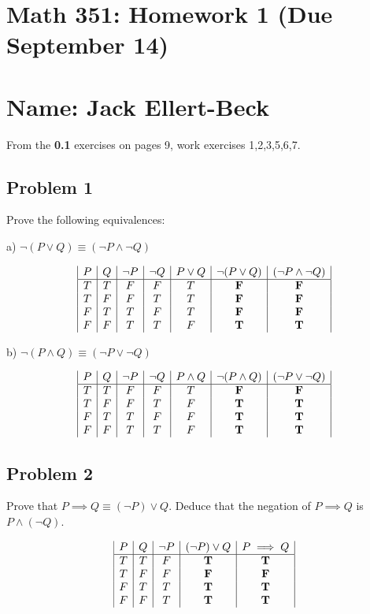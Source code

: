 \documentclass[11pt]{article}
\begin{document}
\setlength{\parindent}{0pt}
\setlength{\parskip}{9pt}


\section*{Math 351: Homework 1 (Due September 14)}
\section*{Name: Jack Ellert-Beck}

\bigskip

From the {\bf 0.1} exercises on pages 9, work exercises 1,2,3,5,6,7.

\subsection*{Problem 1}

Prove the following equivalences:

a) $\lnot (P \lor Q) \equiv (\neg P \land \lnot Q)$

$$
\begin{array}{|c|c|c|c|c|c|c|}
P & Q & \lnot P & \lnot Q & P \lor Q & \lnot (P \lor Q) & (\lnot P \land \lnot Q) \\
\hline
T & T & F & F & T & \bf F & \bf F \\
T & F & F & T & T & \bf F & \bf F \\
F & T & T & F & T & \bf F & \bf F \\
F & F & T & T & F & \bf T & \bf T \\
\end{array}
$$

b) $\lnot (P \land Q) \equiv (\lnot P \lor \lnot Q)$

$$
\begin{array}{|c|c|c|c|c|c|c|}
P & Q & \lnot P & \lnot Q & P \land Q & \lnot (P \land Q) & (\lnot P \lor \lnot Q) \\
\hline
T & T & F & F & T & \bf F & \bf F \\
T & F & F & T & F & \bf T & \bf T \\
F & T & T & F & F & \bf T & \bf T \\
F & F & T & T & F & \bf T & \bf T \\
\end{array}
$$

\subsection*{Problem 2}

Prove that $P \implies Q \equiv (\lnot P) \lor Q$. Deduce that the negation of
$P \implies Q$ is $P \land (\lnot Q)$.

$$
\begin{array}{|c|c|c|c|c|}
P & Q & \lnot P & (\lnot P) \lor Q & P \implies Q \\
\hline
T & T & F & \bf T & \bf T \\
T & F & F & \bf F & \bf F \\
F & T & T & \bf T & \bf T \\
F & F & T & \bf T & \bf T \\
\end{array}
$$
\end{document}
